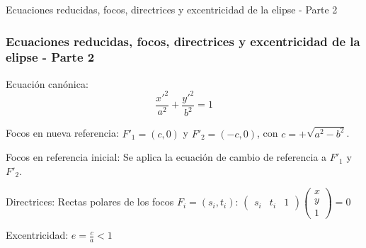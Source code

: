 \documentclass[xcolor={dvipsnames},aspectratio=169,10pt]{beamer}
\begin{document}
\begin{frame}{Ecuaciones reducidas, focos, directrices y excentricidad de la elipse - Parte 2}
  \frametitle{Ecuaciones reducidas, focos, directrices y excentricidad de la elipse - Parte 2}
    Ecuación canónica:
    \[\frac{x'^2}{a^2} + \frac{y'^2}{b^2} = 1\]
    
    Focos en nueva referencia: $F'_1 = (c, 0)$ y $F'_2 = (-c, 0)$, con $c = +\sqrt{a^2 - b^2}$.
    
    Focos en referencia inicial: Se aplica la ecuación de cambio de referencia a $F'_1$ y $F'_2$.
    
    Directrices: Rectas polares de los focos $F_i = (s_i, t_i)$: $\begin{pmatrix} s_i & t_i & 1 \end{pmatrix} \begin{pmatrix} x \\ y \\ 1 \end{pmatrix} = 0$
    
    Excentricidad: $e = \frac{c}{a} < 1$
\end{frame}
\end{document}
